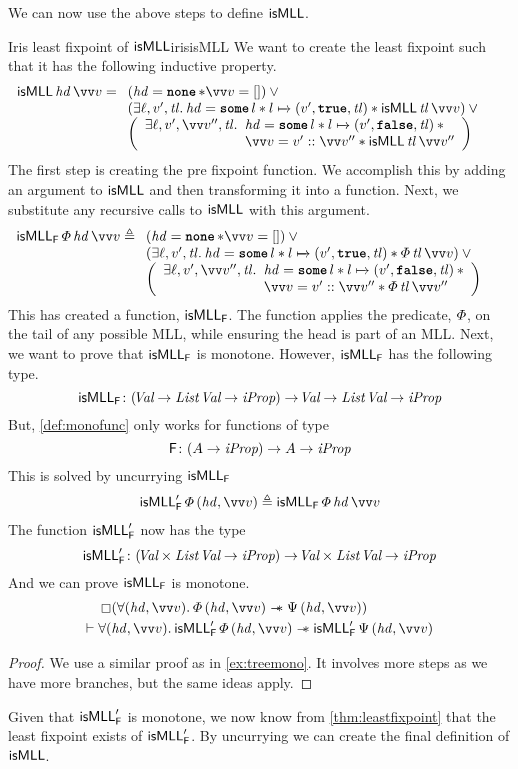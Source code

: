 \documentclass[thesis.tex]{subfiles}
\begin{document}
We can now use the above steps to define $\textsf{\upshape isMLL}$.
\begin{example}{Iris least fixpoint of $\textsf{\upshape isMLL}$}{irisisMLL}
    We want to create the least fixpoint such that it has the following inductive property.
    \begin{align*}
        \isMLL\, \hd\, \vect{\val} & = \isMLLRecDef
    \end{align*}
    The first step is creating the pre fixpoint function. We accomplish this by adding an argument to $\textsf{\upshape isMLL}$ and then transforming it into a function. Next, we substitute any recursive calls to $\textsf{\upshape isMLL}$ with this argument.
    \begin{align*}
        \isMLL_\hopred\, \pred\, \hd\, \vect{v} & \eqdef
        \isMLLFDef
    \end{align*}
    This has created a function, $\textsf{\upshape isMLL}_{\textsf{\upshape F}}$. The function applies the predicate, $\varPhi$, on the tail of any possible MLL, while ensuring the head is part of an MLL. Next, we want to prove that $\textsf{\upshape isMLL}_{\textsf{\upshape F}}$ is monotone. However, $\textsf{\upshape isMLL}_{\textsf{\upshape F}}$ has the following type.
    \[\textsf{\upshape isMLL}_{\textsf{\upshape F}}\colon (\kern-0.2em\textit{Val} \to \textit{List}\ \kern-0.2em\textit{Val} \to \textit{iProp}) \to \kern-0.2em\textit{Val} \to \textit{List}\ \kern-0.2em\textit{Val} \to \textit{iProp}\]
    But, \cref{def:monofunc} only works for functions of type
    \[\textsf{\upshape F}\colon (A \to \textit{iProp}) \to A \to \textit{iProp}\]
    This is solved by uncurrying $\textsf{\upshape isMLL}_{\textsf{\upshape F}}$
    \begin{align*}
        \isMLL'_\hopred\, \pred\, (\hd, \vect{\val}) \eqdef \isMLL_\hopred\, \pred\, \hd\, \vect{\val}
    \end{align*}
    The function $\textsf{\upshape isMLL}'_{\textsf{\upshape F}}$ now has the type
    \[\textsf{\upshape isMLL}'_{\textsf{\upshape F}}\colon (\kern-0.2em\textit{Val} \times \textit{List}\ \kern-0.2em\textit{Val} \to \textit{iProp}) \to  \kern-0.2em\textit{Val} \times \textit{List}\ \kern-0.2em\textit{Val} \to \textit{iProp}\]
    And we can prove $\textsf{\upshape isMLL}_{\textsf{\upshape F}}$ is monotone.
    \begin{align*}
                  & \always(\All(\hd, \vect{\val}). \pred\,(\hd, \vect{\val}) \wand \predB\,(\hd, \vect{\val}))                              \\
        \proves{} & \All(\hd, \vect{\val}). \isMLL'_\hopred\, \pred\, (\hd, \vect{\val}) \wand \isMLL'_\hopred\, \predB\, (\hd, \vect{\val})
    \end{align*}
    \begin{proof}
        We use a similar proof as in \cref{ex:treemono}. It involves more steps as we have more branches, but the same ideas apply.
    \end{proof}
    Given that $\textsf{\upshape isMLL}'_{\textsf{\upshape F}}$ is monotone, we now know from \cref{thm:leastfixpoint} that the least fixpoint exists of $\textsf{\upshape isMLL}'_{\textsf{\upshape F}}$. By uncurrying we can create the final definition of $\textsf{\upshape isMLL}$.

\end{example}
\end{document}
